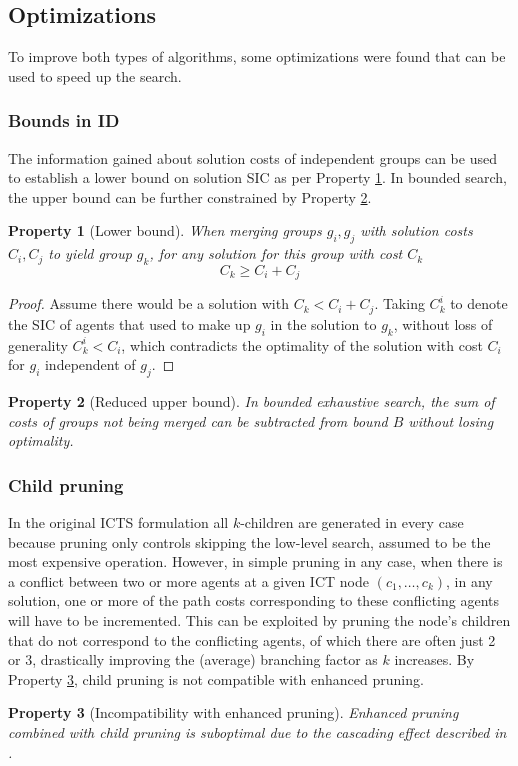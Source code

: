 \documentclass[english]{article}
\newtheorem{property}{Property}
\begin{document}
	\subsection{Optimizations}
	To improve both types of algorithms, some optimizations were found that can be used to speed up the search.
	\subsubsection{Bounds in ID}
	The information gained about solution costs of independent groups can be used to establish a lower bound on solution SIC as per Property \ref{property:id-lower}. In bounded search, the upper bound can be further constrained by Property \ref{property:id-upper}.
	\begin{property}[Lower bound]
		When merging groups $g_i,g_j$ with solution costs $C_i,C_j$ to yield group $g_k$, for any solution for this group with cost $C_k$
		\[C_k\geq C_i + C_j\]
		\label{property:id-lower}
	\end{property}
	\begin{proof}
		Assume there would be a solution with $C_k < C_i + C_j$. Taking $C_k^i$ to denote the SIC of agents that used to make up $g_i$ in the solution to $g_k$, without loss of generality $C_k^i < C_i$, which contradicts the optimality of the solution with cost $C_i$ for $g_i$ independent of $g_j$.
	\end{proof}
	\begin{property}[Reduced upper bound]
		In bounded exhaustive search, the sum of costs of groups not being merged can be subtracted from bound $B$ without losing optimality.
		\label{property:id-upper}
	\end{property}
	\subsubsection{Child pruning}
	In the original ICTS formulation all $k$-children are generated in every case because pruning only controls skipping the low-level search, assumed to be the most expensive operation. However, in simple pruning in any case, when there is a conflict between two or more agents at a given ICT node $(c_1,\ldots,c_k)$, in any solution, one or more of the path costs corresponding to these conflicting agents will have to be incremented. This can be exploited by pruning the node's children that do not correspond to the conflicting agents, of which there are often just 2 or 3, drastically improving the (average) branching factor as $k$ increases. By Property \ref{property:ec-incompat}, child pruning is not compatible with enhanced pruning.
	\begin{property}[Incompatibility with enhanced pruning]
		Enhanced pruning combined with child pruning is suboptimal due to the \textit{cascading effect} described in \cite{sharon2013}.
		\label{property:ec-incompat}
	\end{property}
	
\end{document}
